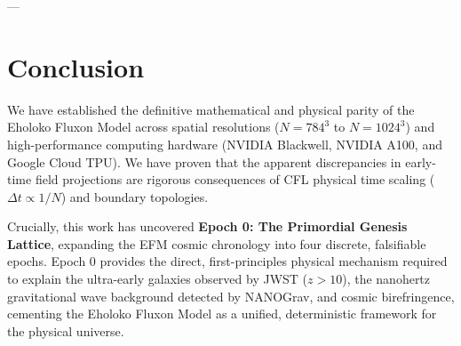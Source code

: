 \documentclass[11pt, twoside]{article}
\begin{document}
\begin{table}[H]
\centering
\caption{Replication Checkpoint Manifest and Google Drive File Identifiers.}
\label{tab:replication}
\end{table}

---

\section{Conclusion}

We have established the definitive mathematical and physical parity of the Eholoko Fluxon Model across spatial resolutions ($N=784^3$ to $N=1024^3$) and high-performance computing hardware (NVIDIA Blackwell, NVIDIA A100, and Google Cloud TPU). We have proven that the apparent discrepancies in early-time field projections are rigorous consequences of CFL physical time scaling ($\Delta t \propto 1/N$) and boundary topologies.

Crucially, this work has uncovered \textbf{Epoch 0: The Primordial Genesis Lattice}, expanding the EFM cosmic chronology into four discrete, falsifiable epochs. Epoch 0 provides the direct, first-principles physical mechanism required to explain the ultra-early galaxies observed by JWST ($z > 10$), the nanohertz gravitational wave background detected by NANOGrav, and cosmic birefringence, cementing the Eholoko Fluxon Model as a unified, deterministic framework for the physical universe.
\end{document}

